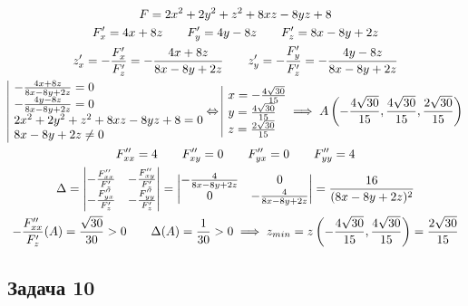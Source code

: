 \documentclass[a4paper,fleqn,12pt]{article}
\theoremstyle{definition}
\begin{document}
\begin{itemize}
\begin{gather*}
F = 2x^2 + 2y^2 + z^2 + 8xz -8yz + 8 \\
F'_x = 4x+ 8z \qquad F'_y = 4y - 8z \qquad F'_z = 8x - 8y + 2z \\
z'_x = - \frac{F'_x}{F'_z} = - \frac{4x+ 8z}{8x - 8y + 2z}\qquad z'_y = -\frac{F'_y}{F'_z} = - \frac{4y - 8z}{8x - 8y + 2z}\\
\begin{array}{|l@{}}
- \frac{4x+ 8z}{8x - 8y + 2z} = 0 \\
- \frac{4y - 8z}{8x - 8y + 2z} = 0\\
2x^2 + 2y^2 + z^2 + 8xz -8yz + 8 = 0\\
8x - 8y + 2z \neq 0\\
\end{array}\Leftrightarrow 
\begin{array}{|l@{}}
x = - \frac{4 \sqrt{30}}{15}\\
y = \frac{4 \sqrt{30}}{15}\\
z = \frac{2 \sqrt{30}}{15}
\end{array} \implies 
A \left( - \frac{4 \sqrt{30}}{15}, \frac{4 \sqrt{30}}{15}, \frac{2 \sqrt{30}}{15}\right) \\
F''_{xx} = 4 \qquad F''_{xy} = 0 \qquad  F''_{yx} = 0 \qquad  F''_{yy} =4 \\
\Delta = \begin{vmatrix} -\frac{F''_{xx}}{F'_z} &  -\frac{F''_{xy}}{F'_z} \\  -\frac{F''_{yx}}{F'_z} &  -\frac{F''_{yy}}{F'_z} \end{vmatrix} = \begin{vmatrix} -\frac{4}{8x - 8y + 2z} & 0 \\  0 &  -\frac{4}{ 8x - 8y + 2z} \end{vmatrix} = \frac{16}{(8x - 8y + 2z)^2} \\
-\frac{F''_{xx}}{F'_z} (A) = \frac{\sqrt{30}}{30}>0 \qquad \Delta(A) = \frac{1}{30}>0 \implies z_{min} = z\left( - \frac{4 \sqrt{30}}{15}, \frac{4 \sqrt{30}}{15} \right) = \frac{2 \sqrt{30}}{15}
\end{gather*}
\end{itemize}

\subsection*{Задача 10}
\end{document}
